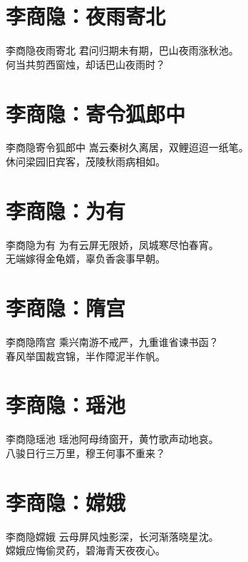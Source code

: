 \documentclass[12pt,oneside,a5paper]{book}
\begin{document}
\chapter{李商隐：夜雨寄北}
\begin{poemzh}{李商隐}{夜雨寄北}
君问归期未有期，巴山夜雨涨秋池。\\
何当共剪西窗烛，却话巴山夜雨时？\\ 
\end{poemzh}

\chapter{李商隐：寄令狐郎中}
\begin{poemzh}{李商隐}{寄令狐郎中}
嵩云秦树久离居，双鲤迢迢一纸笔。\\
休问梁园旧宾客，茂陵秋雨病相如。\\ 
\end{poemzh}

\chapter{李商隐：为有}
\begin{poemzh}{李商隐}{为有}
为有云屏无限娇，凤城寒尽怕春宵。\\
无端嫁得金龟婿，辜负香衾事早朝。\\ 
\end{poemzh}

\chapter{李商隐：隋宫}
\begin{poemzh}{李商隐}{隋宫}
乘兴南游不戒严，九重谁省谏书函？\\
春风举国裁宫锦，半作障泥半作帆。\\ 
\end{poemzh}

\chapter{李商隐：瑶池}
\begin{poemzh}{李商隐}{瑶池}
瑶池阿母绮窗开，黄竹歌声动地哀。\\
八骏日行三万里，穆王何事不重来？\\ 
\end{poemzh}

\chapter{李商隐：嫦娥}
\begin{poemzh}{李商隐}{嫦娥}
云母屏风烛影深，长河渐落晓星沈。\\
嫦娥应悔偷灵药，碧海青天夜夜心。\\ 
\end{poemzh}
\end{document}
